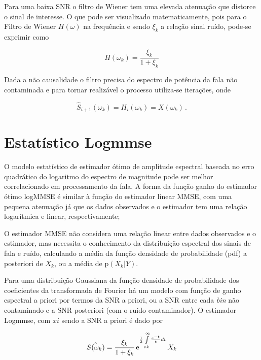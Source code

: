 Para uma baixa SNR o filtro de Wiener tem uma elevada atenuação que distorce o sinal de interesse. O que pode ser visualizado matematicamente, pois para o Filtro de Wiener $H(\omega)$ na frequência e sendo $\xi_k$ a relação sinal ruído,  pode-se \cite{loizou2013speech} exprimir como

\begin{equation}
    H(\omega_k) = \dfrac{\xi_k}{1+\xi_k}
\end{equation}

Dada a não causalidade o filtro precisa do espectro de potência da fala não contaminada e para tornar realizável o processo utiliza-se iterações, onde 

\begin{equation}
   \hat{S}_{i+1}(\omega_k) = H_i(\omega_k) = X(\omega_k) \,.
\end{equation}



\section{Estatístico Logmmse}
O modelo estatístico de estimador ótimo de amplitude espectral baseada no erro quadrático do logaritmo do espectro de magnitude pode ser melhor correlacionado em processamento da fala. A forma da função ganho do estimador ótimo logMMSE é similar à função do estimador linear MMSE, com uma pequena atenuação já que os dados observados e o estimador tem uma relação logarítmica e linear, respectivamente; 

O estimador MMSE não considera uma relação linear entre dados observados e o estimador, mas necessita o conhecimento da distribuição espectral dos sinais de fala e ruído, calculando a média da função densidade de probabilidade (pdf) a posteriori de $X_k$, ou a média de p$(X_k|Y)$.

Para uma distribuição Gaussiana da função densidade de probabilidade dos coeficientes da transformada de Fourier há um modelo \cite{ephraim1984speech} com função de ganho espectral a priori por termos da SNR a priori, ou a SNR entre cada \textit{bin} não contaminado e a SNR posteriori (com o ruído contaminador). O estimador Logmmse, com $xi$ sendo a SNR a priori é dado por


\begin{equation}
    \hat{S(\omega_k)} = \dfrac{\xi_k}{1+\xi_k}\operatorname{e}^{\frac{1}{2}\int\limits_{\nu k}^{\infty }\frac{\operatorname{e}^{-t}}{t}dt}X_k
\end{equation}


